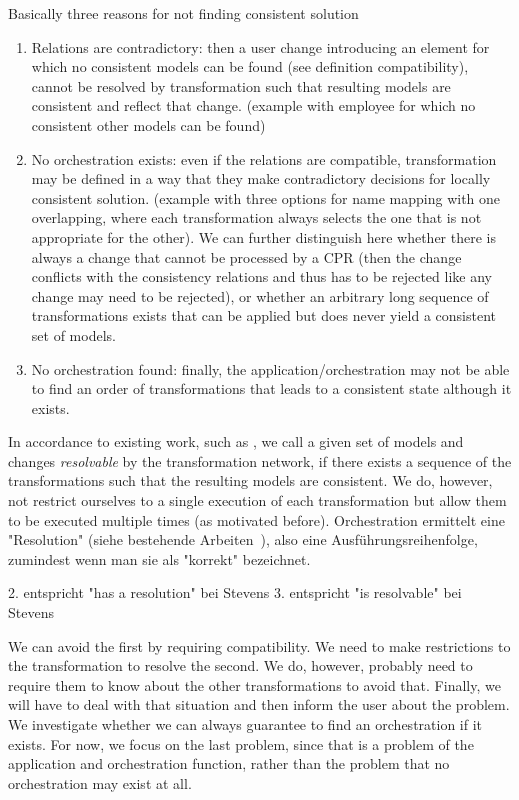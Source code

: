 Basically three reasons for not finding consistent solution
\begin{enumerate}
    \item Relations are contradictory: then a user change introducing an element for which no consistent models can be found (see definition compatibility), cannot be resolved by transformation such that resulting models are consistent and reflect that change. (example with employee for which no consistent other models can be found)
    \item No orchestration exists: even if the relations are compatible, transformation may be defined in a way that they make contradictory decisions for locally consistent solution. (example with three options for name mapping with one overlapping, where each transformation always selects the one that is not appropriate for the other). We can further distinguish here whether there is always a change that cannot be processed by a CPR (then the change conflicts with the consistency relations and thus has to be rejected like any change may need to be rejected), or whether an arbitrary long sequence of transformations exists that can be applied but does never yield a consistent set of models.
    \item No orchestration found: finally, the application/orchestration may not be able to find an order of transformations that leads to a consistent state although it exists.
\end{enumerate}

In accordance to existing work, such as \cite{stevens2020BidirectionalTransformationLarge-SoSym}, we call a given set of models and changes \emph{resolvable} by the transformation network, if there exists a sequence of the transformations such that the resulting models are consistent.
We do, however, not restrict ourselves to a single execution of each transformation but allow them to be executed multiple times (as motivated before).
Orchestration ermittelt eine "Resolution" (siehe bestehende Arbeiten~\cite{stevens2020BidirectionalTransformationLarge-SoSym}), also eine Ausführungsreihenfolge, zumindest wenn man sie als "korrekt" bezeichnet.

2. entspricht "has a resolution" bei Stevens
3. entspricht "is resolvable" bei Stevens

We can avoid the first by requiring compatibility.
We need to make restrictions to the transformation to resolve the second. We do, however, probably need to require them to know about the other transformations to avoid that. Finally, we will have to deal with that situation and then inform the user about the problem.
We investigate whether we can always guarantee to find an orchestration if it exists.
For now, we focus on the last problem, since that is a problem of the application and orchestration function, rather than the problem that no orchestration may exist at all.

